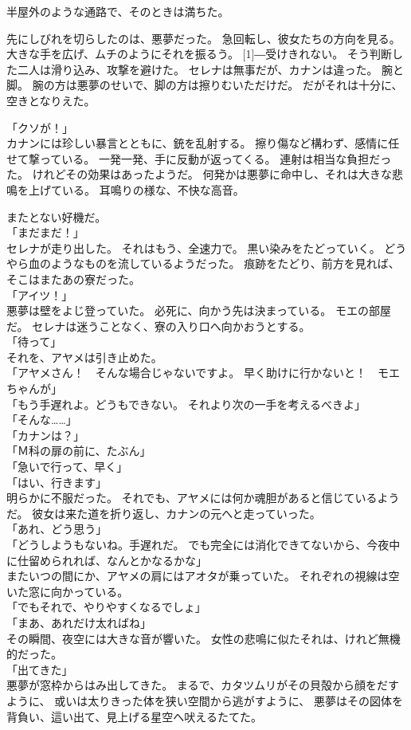 \documentclass[../IHMain]{subfiles}
\begin{document}
半屋外のような通路で、そのときは満ちた。

先にしびれを切らしたのは、悪夢だった。
急回転し、彼女たちの方向を見る。
大きな手を広げ、ムチのようにそれを振るう。
\scalebox{3}[1]{―}受けきれない。
そう判断した二人は滑り込み、攻撃を避けた。
セレナは無事だが、カナンは違った。
腕と脚。
腕の方は悪夢のせいで、脚の方は擦りむいただけだ。
だがそれは十分に、空きとなりえた。

「クソが！」\\
カナンには珍しい暴言とともに、銃を乱射する。
擦り傷など構わず、感情に任せて撃っている。
一発一発、手に反動が返ってくる。
連射は相当な負担だった。
けれどその効果はあったようだ。
何発かは悪夢に命中し、それは大きな悲鳴を上げている。
耳鳴りの様な、不快な高音。

またとない好機だ。\\
「まだまだ！」\\
セレナが走り出した。
それはもう、全速力で。
黒い染みをたどっていく。
どうやら血のようなものを流しているようだった。
痕跡をたどり、前方を見れば、そこはまたあの寮だった。\\
「アイツ！」\\
悪夢は壁をよじ登っていた。
必死に、向かう先は決まっている。
モエの部屋だ。
セレナは迷うことなく、寮の入り口へ向かおうとする。\\
「待って」\\
それを、アヤメは引き止めた。\\
「アヤメさん！　そんな場合じゃないですよ。
早く助けに行かないと！　モエちゃんが」\\
「もう手遅れよ。どうもできない。
それより次の一手を考えるべきよ」\\
「そんな……」\\
「カナンは？」\\
「Ｍ科の扉の前に、たぶん」\\
「急いで行って、早く」\\
「はい、行きます」\\
明らかに不服だった。
それでも、アヤメには何か魂胆があると信じているようだ。
彼女は来た道を折り返し、カナンの元へと走っていった。\\

「あれ、どう思う」\\
「どうしようもないね。手遅れだ。
でも完全には消化できてないから、今夜中に仕留められれば、なんとかなるかな」\\
またいつの間にか、アヤメの肩にはアオタが乗っていた。
それぞれの視線は空いた窓に向かっている。\\
「でもそれで、やりやすくなるでしょ」\\
「まあ、あれだけ太ればね」\\
その瞬間、夜空には大きな音が響いた。
女性の悲鳴に似たそれは、けれど無機的だった。\\
「出てきた」\\
悪夢が窓枠からはみ出してきた。
まるで、カタツムリがその貝殻から顔をだすように、
或いは太りきった体を狭い空間から逃がすように、
悪夢はその図体を背負い、這い出て、見上げる星空へ吠えるたてた。
\end{document}
